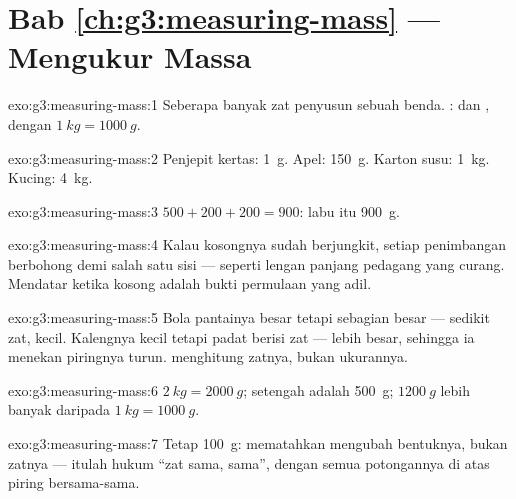 \section*{Bab \ref{ch:g3:measuring-mass} --- Mengukur Massa}

\begin{solution}{exo:g3:measuring-mass:1}
Seberapa banyak zat penyusun sebuah benda. :  dan
, dengan $\qty{1}{kg} = \qty{1000}{g}$.
\end{solution}

\begin{solution}{exo:g3:measuring-mass:2}
Penjepit kertas: \qty{1}{g}. Apel: \qty{150}{g}. Karton susu:
\qty{1}{kg}. Kucing: \qty{4}{kg}.
\end{solution}

\begin{solution}{exo:g3:measuring-mass:3}
$500 + 200 + 200 = 900$:  labu itu \qty{900}{g}.
\end{solution}

\begin{solution}{exo:g3:measuring-mass:4}
Kalau  kosongnya sudah berjungkit, setiap penimbangan berbohong
demi salah satu sisi --- seperti lengan panjang pedagang yang curang.
Mendatar ketika kosong adalah bukti permulaan yang adil.
\end{solution}

\begin{solution}{exo:g3:measuring-mass:5}
Bola pantainya besar tetapi sebagian besar  --- sedikit zat,
 kecil. Kalengnya kecil tetapi padat berisi zat --- 
lebih besar, sehingga ia menekan piringnya turun.  menghitung
zatnya, bukan ukurannya.
\end{solution}

\begin{solution}{exo:g3:measuring-mass:6}
$\qty{2}{kg} = \qty{2000}{g}$; setengah  adalah \qty{500}{g};
$\qty{1200}{g}$ lebih banyak daripada $\qty{1}{kg} = \qty{1000}{g}$.
\end{solution}

\begin{solution}{exo:g3:measuring-mass:7}
Tetap \qty{100}{g}: mematahkan mengubah bentuknya, bukan zatnya ---
itulah hukum ``zat sama,  sama'', dengan semua potongannya di
atas piring bersama-sama.
\end{solution}


